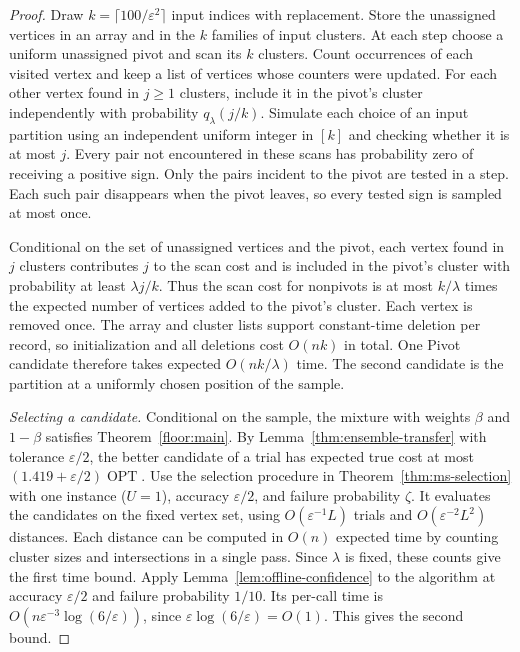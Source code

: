 \documentclass[11pt]{article}
\begin{document}
\begin{proof}
Draw $k=\lceil100/\varepsilon^2\rceil$ input indices with replacement.
Store the unassigned vertices in an array and in the $k$ families of input
clusters. At each step choose a uniform unassigned pivot and scan its $k$
clusters. Count occurrences of each visited vertex and keep a list of
vertices whose counters were updated. For each other vertex found in
$j\ge1$ clusters, include it in the pivot's cluster independently with probability
$q_\lambda(j/k)$. Simulate each choice of an input partition using an independent uniform
integer in $[k]$ and checking whether it is at most $j$.
Every pair not encountered in these scans has probability zero of
receiving a positive sign.
Only the pairs incident to the pivot are tested in a step. Each
such pair disappears when the pivot leaves, so every tested sign is
sampled at most once.

Conditional on the set of unassigned vertices and the pivot, each vertex found in
$j$ clusters contributes $j$ to the scan cost and is included in the pivot's cluster with
probability at least $\lambda j/k$. Thus the scan cost for nonpivots
is at most $k/\lambda$ times the expected number of vertices added to the pivot's cluster.
Each vertex is removed once. The array and cluster lists support
constant-time deletion per record, so initialization and all deletions
cost $O(nk)$ in total. One Pivot candidate therefore takes expected
$O(nk/\lambda)$ time. The second candidate is the partition at a
uniformly chosen position of the sample.

\emph{Selecting a candidate.}
Conditional on the sample, the mixture with weights $\beta$ and
$1-\beta$ satisfies Theorem~\ref{floor:main}. By
Lemma~\ref{thm:ensemble-transfer} with tolerance $\varepsilon/2$, the
better candidate of a trial has expected true cost at most
$(1.419+\varepsilon/2)\operatorname{OPT}$. Use the selection procedure in
Theorem~\ref{thm:ms-selection} with one instance ($U=1$), accuracy
$\varepsilon/2$, and failure probability $\zeta$. It evaluates the
candidates on the fixed vertex set, using
$O(\varepsilon^{-1}L)$ trials and $O(\varepsilon^{-2}L^2)$ distances.
Each distance can be computed in $O(n)$ expected time by counting
cluster sizes and intersections in a single pass. Since $\lambda$ is
fixed, these counts give the first time bound. Apply
Lemma~\ref{lem:offline-confidence} to the algorithm at accuracy
$\varepsilon/2$ and failure probability $1/10$. Its per-call time
is $O(n\varepsilon^{-3}\log(6/\varepsilon))$, since
$\varepsilon\log(6/\varepsilon)=O(1)$. This gives the second bound.
\end{proof}
\end{document}
